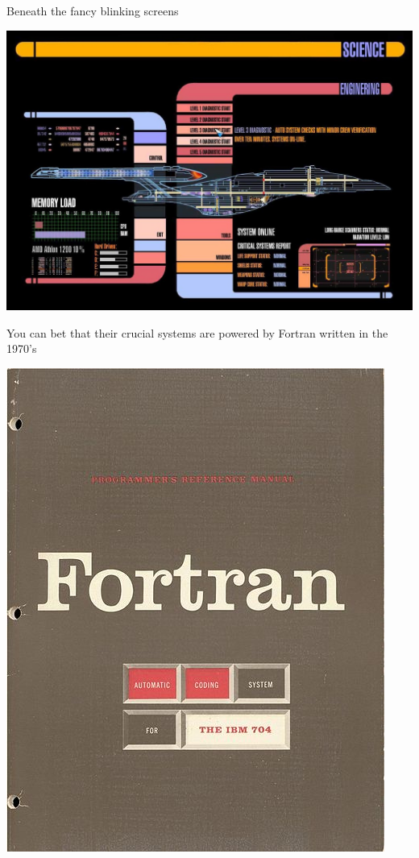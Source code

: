 \begin{frame}
  \begin{block}{Beneath the fancy blinking screens}
    \begin{center}
      \includegraphics[scale=.33]{pics/lcars}
    \end{center}
  \end{block}
\end{frame}

\begin{frame}
  \begin{block}{You can bet that their crucial systems are powered by Fortran written in the 1970's}
    \begin{center}
      \includegraphics[scale=.3]{pics/fortran}
    \end{center}
  \end{block}
\end{frame}




